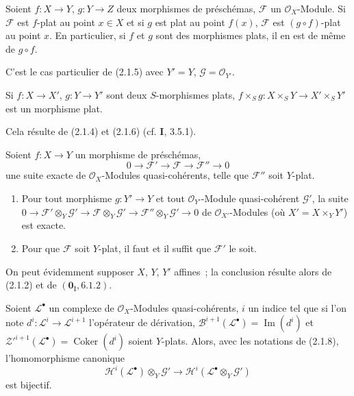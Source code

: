 \begin{corollary}[2.1.6]
\label{IV.2.1.6-fr}
Soient $f:X\to Y$, $g:Y\to Z$ deux morphismes de préschémas, $\mathscr F$ un
$\mathcal O_X$-Module. Si $\mathscr F$ est $f$-plat au point $x\in X$ et si
$g$ est plat au point $f(x)$, $\mathscr F$ est $(g\circ f)$-plat au point $x$. En
particulier, si $f$ et $g$ sont des morphismes plats, il en est de même de
$g\circ f$.
\end{corollary}

C'est le cas particulier de (2.1.5) avec $Y'=Y$, $\mathscr G=\mathcal O_{Y'}$.

\begin{corollary}[2.1.7]
\label{IV.2.1.7-fr}
Si $f:X\to X'$, $g:Y\to Y'$ sont deux $S$-morphismes plats,
$f\times_S g:X\times_S Y\to X'\times_S Y'$ est un morphisme plat.
\end{corollary}

Cela résulte de (2.1.4) et (2.1.6) (cf. \textbf{I}, 3.5.1).

\begin{proposition}[2.1.8]
\label{IV.2.1.8-fr}
Soient $f:X\to Y$ un morphisme de préschémas,
\[
0\to\mathscr F'\to\mathscr F\to\mathscr F''\to0
\]
une suite exacte de $\mathcal O_X$-Modules quasi-cohérents, telle que
$\mathscr F''$ soit $Y$-plat.
\begin{enumerate}
\item[\textup{(i)}] Pour tout morphisme $g:Y'\to Y$ et tout $\mathcal O_{Y'}$-Module
quasi-cohérent $\mathscr G'$, la suite
$0\to\mathscr F'\otimes_Y\mathscr G'\to
\mathscr F\otimes_Y\mathscr G'\to
\mathscr F''\otimes_Y\mathscr G'\to0$
de $\mathcal O_{X'}$-Modules (où $X'=X\times_Y Y'$) est exacte.
\item[\textup{(ii)}] Pour que $\mathscr F$ soit $Y$-plat, il faut et il suffit que
$\mathscr F'$ le soit.
\end{enumerate}
\end{proposition}

On peut évidemment supposer $X$, $Y$, $Y'$ affines~; la conclusion résulte
alors de (2.1.2) et de $(\mathbf{0}_{\mathrm I},6.1.2)$.

\begin{corollary}[2.1.9]
\label{IV.2.1.9-fr}
Soient $\mathscr L^\bullet$ un complexe de $\mathcal O_X$-Modules
quasi-cohérents, $i$ un indice tel que si l'on note
$d^i:\mathscr L^i\to\mathscr L^{i+1}$ l'opérateur de dérivation,
$\mathscr B^{i+1}(\mathscr L^\bullet)=\operatorname{Im}(d^i)$ et
$\mathscr Z'^{i+1}(\mathscr L^\bullet)=\operatorname{Coker}(d^i)$ soient
$Y$-plats. Alors, avec les notations de \textup{(2.1.8)}, l'homomorphisme canonique
\[
\mathscr H^i(\mathscr L^\bullet)\otimes_Y\mathscr G'
\longrightarrow
\mathscr H^i(\mathscr L^\bullet\otimes_Y\mathscr G')
\]
est bijectif.
\end{corollary}

